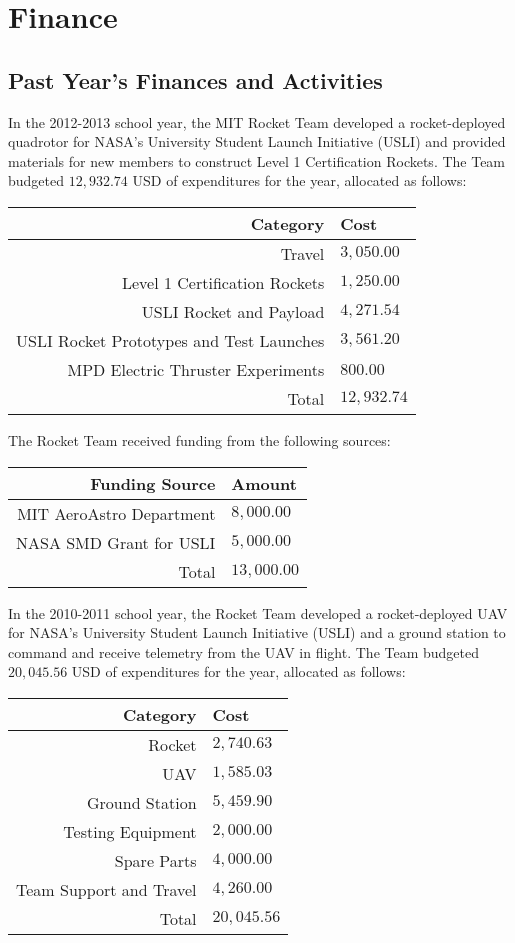 \documentclass{article}
\begin{document}
\section*{Finance}
\subsection*{Past Year's Finances and Activities}
In the 2012-2013 school year, the MIT Rocket Team developed a rocket-deployed quadrotor for NASA's University Student Launch Initiative (USLI) and provided materials for new members to construct Level 1 Certification Rockets. The Team budgeted $12,932.74$ USD of expenditures for the year, allocated as follows:\\
\begin{tabular}{r | l}
Category & Cost \\
\hline
Travel & $3,050.00$\\
Level 1 Certification Rockets & $1,250.00$\\
USLI Rocket and Payload & $4,271.54$\\
USLI Rocket Prototypes and Test Launches & $3,561.20$\\
MPD Electric Thruster Experiments & $800.00$\\
\hline
Total & $12,932.74$\\
\end{tabular}

The Rocket Team received funding from the following sources:\\
\begin{tabular}{r | l}
Funding Source & Amount \\
\hline
MIT AeroAstro Department & $8,000.00$\\
NASA SMD Grant for USLI & $5,000.00$\\
\hline
Total & $13,000.00$\\
\end{tabular}

In the 2010-2011 school year, the Rocket Team developed a rocket-deployed UAV for NASA's University Student Launch Initiative (USLI) and a ground station to command and receive telemetry from the UAV in flight. The Team budgeted $20,045.56$ USD of expenditures for the year, allocated as follows:\\
\begin{tabular}{r | l}
Category & Cost \\
\hline
Rocket & $2,740.63$\\
UAV & $1,585.03$\\
Ground Station & $5,459.90$\\
Testing Equipment & $2,000.00$\\
Spare Parts & $4,000.00$\\
Team Support and Travel & $4,260.00$\\
\hline
Total & $20,045.56$\\
\end{tabular}
\end{document}
